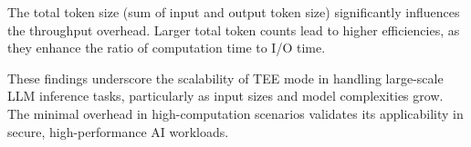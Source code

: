\documentclass{article}
\begin{document}
The total token size (sum of input and output token size) significantly influences the throughput overhead. Larger total token counts lead to higher efficiencies, as they enhance the ratio of computation time to I/O time.

These findings underscore the scalability of TEE mode in handling large-scale LLM inference tasks, particularly as input sizes and model complexities grow. The minimal overhead in high-computation scenarios validates its applicability in secure, high-performance AI workloads.




\end{document}
